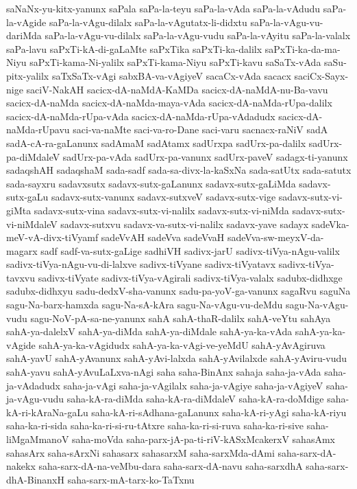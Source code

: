 {saNaNx-yu-kitx-yanunx
saPala
saPa-la-teyu
saPa-la-vAda
saPa-la-vAdudu
saPa-la-vAgide
saPa-la-vAgu-dilalx
saPa-la-vAgutatx-li-didxtu
saPa-la-vAgu-vu-dariMda
saPa-la-vAgu-vu-dilalx
saPa-la-vAgu-vudu
saPa-la-vAyitu
saPa-la-valalx
saPa-lavu
saPxTi-kA-di-gaLaMte
saPxTika
saPxTi-ka-dalilx
saPxTi-ka-da-ma-Niyu
saPxTi-kama-Ni-yalilx
saPxTi-kama-Niyu
saPxTi-kavu
saSaTx-vAda
saSu-pitx-yalilx
saTxSaTx-vAgi
sabxBA-va-vAgiyeV
sacaCx-vAda
sacacx
saciCx-Sayx-nige
saciV-NakAH
sacicx-dA-naMdA-KaMDa
sacicx-dA-naMdA-nu-Ba-vavu
sacicx-dA-naMda
sacicx-dA-naMda-maya-vAda
sacicx-dA-naMda-rUpa-dalilx
sacicx-dA-naMda-rUpa-vAda
sacicx-dA-naMda-rUpa-vAdadudx
sacicx-dA-naMda-rUpavu
saci-va-naMte
saci-va-ro-Dane
saci-varu
sacnacx-raNiV
sadA
sadA-cA-ra-gaLanunx
sadAmaM
sadAtamx
sadUrxpa
sadUrx-pa-dalilx
sadUrx-pa-diMdaleV
sadUrx-pa-vAda
sadUrx-pa-vanunx
sadUrx-paveV
sadagx-ti-yanunx
sadaqshAH
sadaqshaM
sada-sadf
sada-sa-divx-la-kaSxNa
sada-satUtx
sada-satutx
sada-sayxru
sadavxsutx
sadavx-sutx-gaLanunx
sadavx-sutx-gaLiMda
sadavx-sutx-gaLu
sadavx-sutx-vanunx
sadavx-sutxveV
sadavx-sutx-vige
sadavx-sutx-vi-giMta
sadavx-sutx-vina
sadavx-sutx-vi-nalilx
sadavx-sutx-vi-niMda
sadavx-sutx-vi-niMdaleV
sadavx-sutxvu
sadavx-va-sutx-vi-nalilx
sadavx-yave
sadayx
sadeVka-meV-vA-divx-tiVyamf
sadeVvAH
sadeVva
sadeVvaH
sadeVva-sw-meyxV-da-magarx
sadf
sadf-va-sutx-gaLige
sadhiVH
sadivx-jarU
sadivx-tiVya-nAgu-valilx
sadivx-tiVya-nAgu-vu-di-lalxve
sadivx-tiVyane
sadivx-tiVyatavx
sadivx-tiVya-tavxvu
sadivx-tiVyate
sadivx-tiVya-vAgirali
sadivx-tiVya-valalx
sadubx-didhxge
sadubx-didhxyu
sadu-dedxV-sha-vanunx
sadu-pa-yoV-ga-vanunx
sagaRvu
saguNa
sagu-Na-barx-hamxda
sagu-Na-sA-kAra
sagu-Na-vAgu-vu-deMdu
sagu-Na-vAgu-vudu
sagu-NoV-pA-sa-ne-yanunx
sahA
sahA-thaR-dalilx
sahA-veYtu
sahAya
sahA-ya-dalelxV
sahA-ya-diMda
sahA-ya-diMdale
sahA-ya-ka-vAda
sahA-ya-ka-vAgide
sahA-ya-ka-vAgidudx
sahA-ya-ka-vAgi-ve-yeMdU
sahA-yAvAgiruva
sahA-yavU
sahA-yAvanunx
sahA-yAvi-lalxda
sahA-yAvilalxde
sahA-yAviru-vudu
sahA-yavu
sahA-yAvuLaLxva-nAgi
saha
saha-BinAnx
sahaja
saha-ja-vAda
saha-ja-vAdadudx
saha-ja-vAgi
saha-ja-vAgilalx
saha-ja-vAgiye
saha-ja-vAgiyeV
saha-ja-vAgu-vudu
saha-kA-ra-diMda
saha-kA-ra-diMdaleV
saha-kA-ra-doMdige
saha-kA-ri-kAraNa-gaLu
saha-kA-ri-sAdhana-gaLanunx
saha-kA-ri-yAgi
saha-kA-riyu
saha-ka-ri-sida
saha-ka-ri-si-ru-tAtxre
saha-ka-ri-si-ruva
saha-ka-ri-sive
saha-liMgaMmanoV
saha-moVda
saha-parx-jA-pa-ti-riV-kASxMcakerxV
sahasAmx
sahasArx
saha-sArxNi
sahasarx
sahasarxM
saha-sarxMda-dAmi
saha-sarx-dA-nakekx
saha-sarx-dA-na-veMbu-dara
saha-sarx-dA-navu
saha-sarxdhA
saha-sarx-dhA-BinanxH
saha-sarx-mA-tarx-ko-TaTxnu
}
